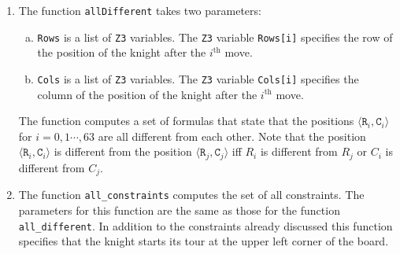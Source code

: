 \begin{enumerate}
      In line 18 we use the fact that the function \texttt{Z3.Or} can take any number of arguments.  If
      \texttt{Formulas} is the set  
      \\[0.2cm]
      \hspace*{1.3cm}
      $\texttt{Formulas} = \{f_1, \cdots, f_n\}$,
      \\[0.2cm]
      then the notation \texttt{z3.Or(...Formulas)} is expanded into the call
      \\[0.2cm]
      \hspace*{1.3cm}
      $\texttt{z3.Or}(f_1, \cdots, f_n)$,
      \\[0.2cm]
      which computes the logical disjunction
      \\[0.2cm]
      \hspace*{1.3cm}
      $f_1 \vee \cdots \vee f_n$.
\item The function \texttt{allDifferent} takes two parameters:
      \begin{enumerate}[(a)]
      \item \texttt{Rows} is a list of \texttt{Z3} variables. The \texttt{Z3} variable \texttt{Rows[i]}
            specifies the row of the position of the knight after the $i^{\textrm{th}}$ move. 
      \item \texttt{Cols} is a list of \texttt{Z3} variables. The \texttt{Z3} variable \texttt{Cols[i]}
            specifies the column of the position of the knight after the $i^{\textrm{th}}$ move. 
      \end{enumerate}
      The function computes a set of formulas that state that the positions
      $\langle \mathtt{R}_i, \mathtt{C}_i \rangle$ for $i=0,1\cdots, 63$ are all different from each other.
      Note that the position $\langle \mathtt{R}_i, \mathtt{C}_i \rangle$ is different from the position
      $\langle \mathtt{R}_j, \mathtt{C}_j \rangle$ iff $R_i$ is different from $R_j$ or $C_i$ is different from
      $C_j$.
\item The function \texttt{all\_constraints} computes the set of all constraints.
      The parameters for this function are the same as those for the function \texttt{all\_different}.
      In addition to the constraints already discussed this function specifies that the knight starts
      its tour at the upper left corner of the board.


\end{enumerate}
